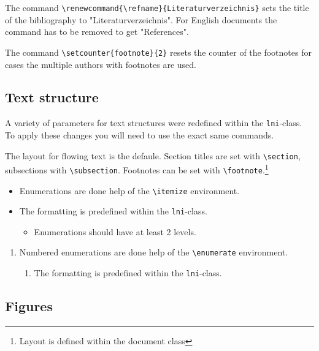 \documentclass[english]{lni}
\begin{document}
The command \verb|\renewcommand{\refname}{Literaturverzeichnis}| sets the title of the bibliography to "Literaturverzeichnis". For English documents the command has to be removed to get "References".

The command \verb|\setcounter{footnote}{2}| resets the counter of the footnotes for cases the multiple authors with footnotes are used.

\subsection{Text structure}

A variety of parameters for text structures were redefined within the \texttt{lni}-class. To apply these changes you will need to use the exact same commands.

The layout for flowing text is the defaule. 
Section titles are set with \verb|\section|, subsections with \verb|\subsection|. Footnotes can be set with \verb|\footnote|.\footnote{Layout is defined within the document class}
\begin{itemize} 
\item Enumerations are done help of the \verb|\itemize| environment.
\item The formatting is predefined within the \texttt{lni}-class. 
\begin{itemize}
\item Enumerations should have at least 2 levels. 
\end{itemize}
\end{itemize}
\begin{enumerate} 
\item Numbered enumerations are done help of the \verb|\enumerate| environment.
\begin{enumerate} 
\item The formatting is predefined within the \texttt{lni}-class.
\end{enumerate}
\end{enumerate}

\subsection{Figures}
\end{document}
